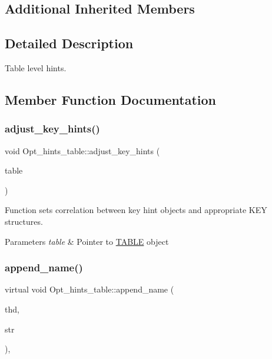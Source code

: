 \subsection*{Additional Inherited Members}


\subsection{Detailed Description}
Table level hints. 

\subsection{Member Function Documentation}
\mbox{\label{classOpt__hints__table_aeac4bb4a24d03d700942dec8410dc525}} 
\subsubsection{\texorpdfstring{adjust\+\_\+key\+\_\+hints()}{adjust\_key\_hints()}}
{\footnotesize\ttfamily void Opt\+\_\+hints\+\_\+table\+::adjust\+\_\+key\+\_\+hints (\begin{DoxyParamCaption}\item[{\mbox{\hyperlink{structTABLE}{T\+A\+B\+LE}} $\ast$}]{table }\end{DoxyParamCaption})}

Function sets correlation between key hint objects and appropriate K\+EY structures.


\begin{DoxyParams}{Parameters}
{\em table} & Pointer to \mbox{\hyperlink{structTABLE}{T\+A\+B\+LE}} object \\
\hline
\end{DoxyParams}
\mbox{\label{classOpt__hints__table_a6346c17e9a02e2724480b271c5b6c867}} 
\subsubsection{\texorpdfstring{append\+\_\+name()}{append\_name()}}
{\footnotesize\ttfamily virtual void Opt\+\_\+hints\+\_\+table\+::append\+\_\+name (\begin{DoxyParamCaption}\item[{T\+HD $\ast$}]{thd,  }\item[{String $\ast$}]{str }\end{DoxyParamCaption})\hspace{0.3cm}{\ttfamily [inline]}, {\ttfamily [virtual]}}

